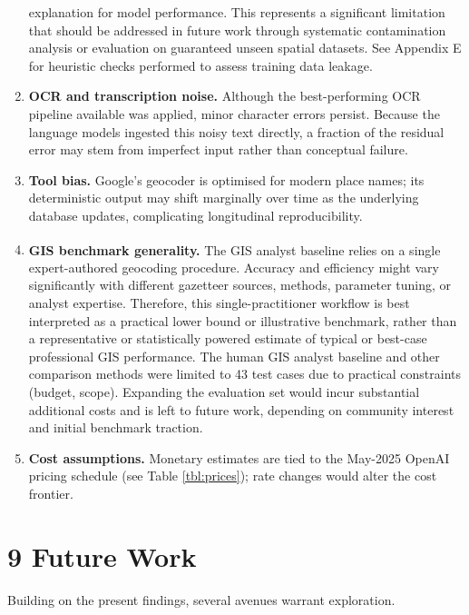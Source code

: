 \documentclass[
  10pt]{article}
\begin{document}
\begin{enumerate}
  explanation for model performance. This represents a significant
  limitation that should be addressed in future work through systematic
  contamination analysis or evaluation on guaranteed unseen spatial
  datasets. See Appendix E for heuristic checks performed to assess
  training data leakage.
\item
  \textbf{OCR and transcription noise.} Although the best-performing OCR
  pipeline available was applied, minor character errors persist.
  Because the language models ingested this noisy text directly, a
  fraction of the residual error may stem from imperfect input rather
  than conceptual failure.
\item
  \textbf{Tool bias.} Google's geocoder is optimised for modern place
  names; its deterministic output may shift marginally over time as the
  underlying database updates, complicating longitudinal
  reproducibility.
\item
  \textbf{GIS benchmark generality.} The GIS analyst
  baseline\textsuperscript{} relies on
  a single expert-authored geocoding procedure. Accuracy and efficiency
  might vary significantly with different gazetteer sources, methods,
  parameter tuning, or analyst expertise. Therefore, this
  single-practitioner workflow is best interpreted as a practical lower
  bound or illustrative benchmark, rather than a representative or
  statistically powered estimate of typical or best-case professional
  GIS performance. The human GIS analyst baseline and other comparison
  methods were limited to 43 test cases due to practical constraints
  (budget, scope). Expanding the evaluation set would incur substantial
  additional costs and is left to future work, depending on community
  interest and initial benchmark traction.
\item
  \textbf{Cost assumptions.} Monetary estimates are tied to the May-2025
  OpenAI pricing schedule (see Table \ref{tbl:prices}); rate changes
  would alter the cost frontier.
\end{enumerate}

\section{9 Future Work}\label{future-work}

Building on the present findings, several avenues warrant exploration.
\end{document}
